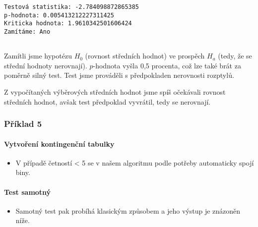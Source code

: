 \documentclass[11pt]{article}
\providecommand{\tightlist}{%
      \setlength{\itemsep}{0pt}\setlength{\parskip}{0pt}}
\begin{document}
    \begin{Verbatim}[commandchars=\\\{\}]
Testová statistika: -2.784098872865385
p-hodnota: 0.005413212227311425
Kriticka hodnota: 1.9610342501606424
Zamítáme: Ano 


    \end{Verbatim}

    Zamítli jsme hypotézu \(H_0\) (rovnost středních hodnot) ve prospěch
\(H_a\) (tedy, že se střední hodnoty nerovnají). \(p\)-hodnota vyšla 0,5
procenta, což lze také brát za poměrně silný test. Test jsme prováděli s
předpokladen nerovnosti rozptylů.

Z vypočítaných výběrových středních hodnot jsme spíš očekávali rovnost
středních hodnot, avšak test předpoklad vyvrátil, tedy se nerovnají.
\newpage
    \hypertarget{pux159uxedklad-5}{%
\subsubsection{Příklad 5}\label{pux159uxedklad-5}}

\hypertarget{vytvoux159enuxed-kontingenux10dnuxed-tabulky}{%
\paragraph{Vytvoření kontingenční
tabulky}\label{vytvoux159enuxed-kontingenux10dnuxed-tabulky}}

\begin{itemize}
\tightlist
\item
  V případě četností \textless{} 5 se v našem algoritmu podle potřeby
  automaticky spojí biny.
\end{itemize}

\hypertarget{test-samotnuxfd}{%
\paragraph{Test samotný}\label{test-samotnuxfd}}

\begin{itemize}
\tightlist
\item
  Samotný test pak probíhá klasickým způsobem a jeho výstup je znázoněn
  níže.
\end{itemize}
\end{document}

